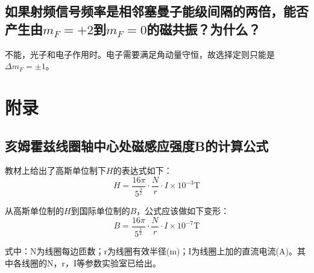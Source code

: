 \documentclass[a4paper]{article}
\begin{document}
\subsection{如果射频信号频率是相邻塞曼子能级间隔的两倍，能否产生由$m_F = +2$到$m_F = 0$的磁共振？为什么？}
不能，光子和电子作用时。电子需要满足角动量守恒，故选择定则只能是$\Delta m_F = \pm 1$。

\section{附录}
\subsection{亥姆霍兹线圈轴中心处磁感应强度B的计算公式}
教材上给出了高斯单位制下$H$的表达式如下：
\begin{equation}
H = \frac{16\pi}{5^{\frac{3}{2}}}\cdot \frac{N}{r}\cdot I\times 10^{-3} \text{T}\label{eq9}
\end{equation}

从高斯单位制的$H$到国际单位制的$B$，公式应该做如下变形：
\begin{equation}
B = \frac{16\pi}{5^{\frac{3}{2}}}\cdot \frac{N}{r}\cdot I\times 10^{-7} \text{T}\label{eq10}
\end{equation}

式中：N为线圈每边匝数；r为线圈有效半径(m)；I为线圈上加的直流电流(A)。其中各线圈的N，r，I等参数实验室已给出。
\end{document}
